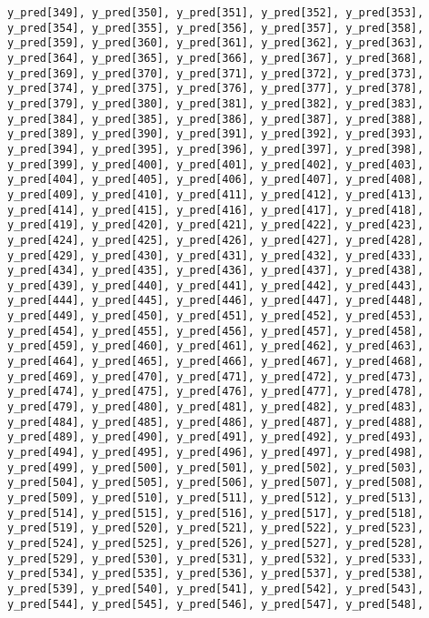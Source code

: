 \documentclass[
  letterpaper,
  DIV=11,
  numbers=noendperiod]{scrartcl}
\begin{document}
\begin{verbatim}
y_pred[349], y_pred[350], y_pred[351], y_pred[352], y_pred[353],
y_pred[354], y_pred[355], y_pred[356], y_pred[357], y_pred[358],
y_pred[359], y_pred[360], y_pred[361], y_pred[362], y_pred[363],
y_pred[364], y_pred[365], y_pred[366], y_pred[367], y_pred[368],
y_pred[369], y_pred[370], y_pred[371], y_pred[372], y_pred[373],
y_pred[374], y_pred[375], y_pred[376], y_pred[377], y_pred[378],
y_pred[379], y_pred[380], y_pred[381], y_pred[382], y_pred[383],
y_pred[384], y_pred[385], y_pred[386], y_pred[387], y_pred[388],
y_pred[389], y_pred[390], y_pred[391], y_pred[392], y_pred[393],
y_pred[394], y_pred[395], y_pred[396], y_pred[397], y_pred[398],
y_pred[399], y_pred[400], y_pred[401], y_pred[402], y_pred[403],
y_pred[404], y_pred[405], y_pred[406], y_pred[407], y_pred[408],
y_pred[409], y_pred[410], y_pred[411], y_pred[412], y_pred[413],
y_pred[414], y_pred[415], y_pred[416], y_pred[417], y_pred[418],
y_pred[419], y_pred[420], y_pred[421], y_pred[422], y_pred[423],
y_pred[424], y_pred[425], y_pred[426], y_pred[427], y_pred[428],
y_pred[429], y_pred[430], y_pred[431], y_pred[432], y_pred[433],
y_pred[434], y_pred[435], y_pred[436], y_pred[437], y_pred[438],
y_pred[439], y_pred[440], y_pred[441], y_pred[442], y_pred[443],
y_pred[444], y_pred[445], y_pred[446], y_pred[447], y_pred[448],
y_pred[449], y_pred[450], y_pred[451], y_pred[452], y_pred[453],
y_pred[454], y_pred[455], y_pred[456], y_pred[457], y_pred[458],
y_pred[459], y_pred[460], y_pred[461], y_pred[462], y_pred[463],
y_pred[464], y_pred[465], y_pred[466], y_pred[467], y_pred[468],
y_pred[469], y_pred[470], y_pred[471], y_pred[472], y_pred[473],
y_pred[474], y_pred[475], y_pred[476], y_pred[477], y_pred[478],
y_pred[479], y_pred[480], y_pred[481], y_pred[482], y_pred[483],
y_pred[484], y_pred[485], y_pred[486], y_pred[487], y_pred[488],
y_pred[489], y_pred[490], y_pred[491], y_pred[492], y_pred[493],
y_pred[494], y_pred[495], y_pred[496], y_pred[497], y_pred[498],
y_pred[499], y_pred[500], y_pred[501], y_pred[502], y_pred[503],
y_pred[504], y_pred[505], y_pred[506], y_pred[507], y_pred[508],
y_pred[509], y_pred[510], y_pred[511], y_pred[512], y_pred[513],
y_pred[514], y_pred[515], y_pred[516], y_pred[517], y_pred[518],
y_pred[519], y_pred[520], y_pred[521], y_pred[522], y_pred[523],
y_pred[524], y_pred[525], y_pred[526], y_pred[527], y_pred[528],
y_pred[529], y_pred[530], y_pred[531], y_pred[532], y_pred[533],
y_pred[534], y_pred[535], y_pred[536], y_pred[537], y_pred[538],
y_pred[539], y_pred[540], y_pred[541], y_pred[542], y_pred[543],
y_pred[544], y_pred[545], y_pred[546], y_pred[547], y_pred[548],

\end{verbatim}
\end{document}
